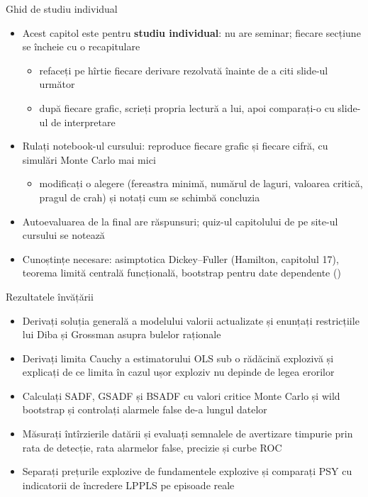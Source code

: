 \begin{frame}{Ghid de studiu individual}
\itemsize{\small}
\begin{itemize}
    \item Acest capitol este pentru \textbf{studiu individual}: nu are seminar; fiecare secțiune se încheie cu o recapitulare
    \begin{itemize}
        \item refaceți pe hîrtie fiecare derivare rezolvată înainte de a citi slide-ul următor
        \item după fiecare grafic, scrieți propria lectură a lui, apoi comparați-o cu slide-ul de interpretare
    \end{itemize}
    \item Rulați notebook-ul cursului: reproduce fiecare grafic și fiecare cifră, cu simulări Monte Carlo mai mici
    \begin{itemize}
        \item modificați o alegere (fereastra minimă, numărul de laguri, valoarea critică, pragul de crah) și notați cum se schimbă concluzia
    \end{itemize}
    \item Autoevaluarea de la final are răspunsuri; quiz-ul capitolului de pe site-ul cursului se notează
    \item Cunoștințe necesare: asimptotica Dickey--Fuller (Hamilton, capitolul 17), teorema limită centrală funcțională, bootstrap pentru date dependente ()
\end{itemize}
\end{frame}

\begin{frame}{Rezultatele învățării}
\itemsize{\small}
\begin{itemize}
    \item Derivați soluția generală a modelului valorii actualizate și enunțați restricțiile lui Diba și Grossman asupra bulelor raționale
    \item Derivați limita Cauchy a estimatorului OLS sub o rădăcină explozivă și explicați de ce limita în cazul ușor exploziv nu depinde de legea erorilor
    \item Calculați SADF, GSADF și BSADF cu valori critice Monte Carlo și wild bootstrap și controlați alarmele false de-a lungul datelor
    \item Măsurați întîrzierile datării și evaluați semnalele de avertizare timpurie prin rata de detecție, rata alarmelor false, precizie și curbe ROC
    \item Separați prețurile explozive de fundamentele explozive și comparați PSY cu indicatorii de încredere LPPLS pe episoade reale
\end{itemize}
\end{frame}

